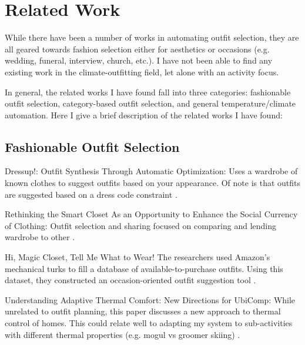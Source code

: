 \section{Related Work}
\label{section:relatedwork}
While there have been a number of works in automating outfit selection, they are all geared towards
fashion selection either for aesthetics or occasions (e.g. wedding, funeral, interview, church, etc.).
I have not been able to find any existing work in the climate-outfitting field, let alone with an
activity focus.

In general, the related works I have found fall into three categories: fashionable outfit selection, category-based 
outfit selection, and general temperature/climate automation. Here I give a brief description of the related works
I have found:

\subsection{Fashionable Outfit Selection}
\begin{description}
  \item{Dressup!: Outfit Synthesis Through Automatic Optimization:} Uses a wardrobe of known clothes to suggest 
  outfits based on your appearance. Of note is that outfits are suggested based on a dress code constraint \cite{Dressup}.
  \item{Rethinking the Smart Closet As an Opportunity to Enhance the Social Currency of Clothing:} Outfit selection and 
  sharing focused on comparing and lending wardrobe to other \cite{SmartCloset}.
  \item{Hi, Magic Closet, Tell Me What to Wear!} The researchers used Amazon's mechanical turks to fill a database
  of available-to-purchase outfits. Using this dataset, they constructed an occasion-oriented outfit suggestion
  tool \cite{MagicCloset}.
  \item{Understanding Adaptive Thermal Comfort: New Directions for UbiComp:} While unrelated to outfit planning, this
  paper discusses a new approach to thermal control of homes. This could relate well to adapting my system to sub-activities
  with different thermal properties (e.g. mogul vs groomer skiing) \cite{ThermalComfort}.
\end{description}

